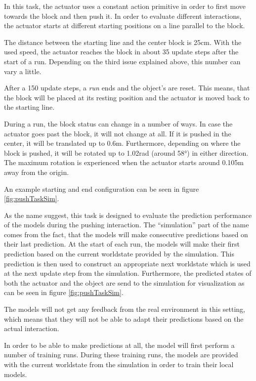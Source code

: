 In this task, the actuator uses a constant action primitive in order to first move towards the block and then push it.
In order to evaluate different interactions, the actuator starts at different starting positions on a line parallel to the block. 

The distance between the starting line and the center block is 25cm. With the used speed, the actuator reaches the block in about 35 update steps after the start of a run. Depending on the third issue explained above, this number can vary a little.

After a 150 update steps, a \textit{run} ends and the object's are reset. This means, that the block will be placed at its resting position and the actuator is moved back to the starting line. 

During a run, the block status can change in a number of ways. In case the actuator goes past the block, it will not change at all. If it is pushed in the center, it will be translated up to 0.6m. Furthermore, depending on where the block is pushed, it will be rotated up to 1.02rad (around 58°) in either direction. The maximum rotation is experienced when the actuator starts around 0.105m away from the origin.

An example starting and end configuration can be seen in figure \ref{fig:pushTaskSim}. 

As the name suggest, this task is designed to evaluate the prediction performance of the models during the pushing interaction. The \enquote{simulation} part of the name comes from the fact, that the models will make consecutive predictions based on their last prediction. At the start of each run, the models will make their first prediction based on the current worldstate provided by the simulation. This prediction is then used to construct an appropriate next worldstate which is used at the next update step from the simulation.
Furthermore, the predicted states of both the actuator and the object are send to the simulation for visualization as can be seen in figure \ref{fig:pushTaskSim}.

The models will not get any feedback from the real environment in this setting, which means that they will not be able to adapt their predictions based on the actual interaction. 

In order to be able to make predictions at all, the model will first perform a number of training runs. During these training runs, the models are provided with the current worldstate from the simulation in order to train their local models.

